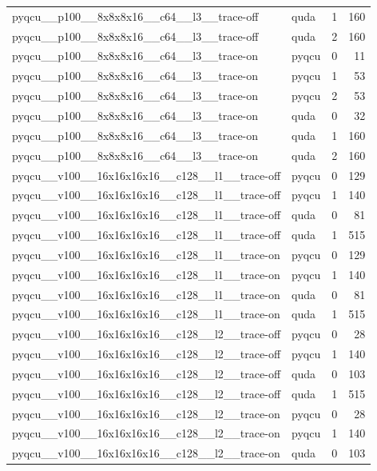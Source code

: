 \begin{table}[htbp]
\begin{tabular}{@{}llrr@{}}
pyqcu\_\_p100\_\_8x8x8x16\_\_c64\_\_l3\_\_trace-off & quda & 1 & 160 \\
pyqcu\_\_p100\_\_8x8x8x16\_\_c64\_\_l3\_\_trace-off & quda & 2 & 160 \\
pyqcu\_\_p100\_\_8x8x8x16\_\_c64\_\_l3\_\_trace-on & pyqcu & 0 & 11 \\
pyqcu\_\_p100\_\_8x8x8x16\_\_c64\_\_l3\_\_trace-on & pyqcu & 1 & 53 \\
pyqcu\_\_p100\_\_8x8x8x16\_\_c64\_\_l3\_\_trace-on & pyqcu & 2 & 53 \\
pyqcu\_\_p100\_\_8x8x8x16\_\_c64\_\_l3\_\_trace-on & quda & 0 & 32 \\
pyqcu\_\_p100\_\_8x8x8x16\_\_c64\_\_l3\_\_trace-on & quda & 1 & 160 \\
pyqcu\_\_p100\_\_8x8x8x16\_\_c64\_\_l3\_\_trace-on & quda & 2 & 160 \\
pyqcu\_\_v100\_\_16x16x16x16\_\_c128\_\_l1\_\_trace-off & pyqcu & 0 & 129 \\
pyqcu\_\_v100\_\_16x16x16x16\_\_c128\_\_l1\_\_trace-off & pyqcu & 1 & 140 \\
pyqcu\_\_v100\_\_16x16x16x16\_\_c128\_\_l1\_\_trace-off & quda & 0 & 81 \\
pyqcu\_\_v100\_\_16x16x16x16\_\_c128\_\_l1\_\_trace-off & quda & 1 & 515 \\
pyqcu\_\_v100\_\_16x16x16x16\_\_c128\_\_l1\_\_trace-on & pyqcu & 0 & 129 \\
pyqcu\_\_v100\_\_16x16x16x16\_\_c128\_\_l1\_\_trace-on & pyqcu & 1 & 140 \\
pyqcu\_\_v100\_\_16x16x16x16\_\_c128\_\_l1\_\_trace-on & quda & 0 & 81 \\
pyqcu\_\_v100\_\_16x16x16x16\_\_c128\_\_l1\_\_trace-on & quda & 1 & 515 \\
pyqcu\_\_v100\_\_16x16x16x16\_\_c128\_\_l2\_\_trace-off & pyqcu & 0 & 28 \\
pyqcu\_\_v100\_\_16x16x16x16\_\_c128\_\_l2\_\_trace-off & pyqcu & 1 & 140 \\
pyqcu\_\_v100\_\_16x16x16x16\_\_c128\_\_l2\_\_trace-off & quda & 0 & 103 \\
pyqcu\_\_v100\_\_16x16x16x16\_\_c128\_\_l2\_\_trace-off & quda & 1 & 515 \\
pyqcu\_\_v100\_\_16x16x16x16\_\_c128\_\_l2\_\_trace-on & pyqcu & 0 & 28 \\
pyqcu\_\_v100\_\_16x16x16x16\_\_c128\_\_l2\_\_trace-on & pyqcu & 1 & 140 \\
pyqcu\_\_v100\_\_16x16x16x16\_\_c128\_\_l2\_\_trace-on & quda & 0 & 103 \\

\end{tabular}
\end{table}
